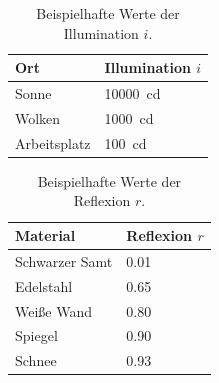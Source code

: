 \documentclass[a4paper, 11pt, accentcolor = tud3b]{tudreport}
\begin{document}
					\begin{table}
						\centering
						\begin{tabular}{l|l}
							Ort          & Illumination \(i\)   \\ \hline
							Sonne        & \SI{10000}{\candela} \\
							Wolken       & \SI{1000}{\candela}  \\
							Arbeitsplatz & \SI{100}{\candela}
						\end{tabular}
						\caption{Beispielhafte Werte der Illumination \(i\).}
						\label{tab:example_illumination}
					\end{table}
					\begin{table}
						\centering
						\begin{tabular}{l|l}
							Material       & Reflexion \(r\) \\ \hline
							Schwarzer Samt & \num{0.01}      \\
							Edelstahl      & \num{0.65}      \\
							Weiße Wand     & \num{0.80}      \\
							Spiegel        & \num{0.90}      \\
							Schnee         & \num{0.93}
						\end{tabular}
						\caption{Beispielhafte Werte der Reflexion \(r\).}
						\label{tab:example_reflexion}
					\end{table}
				
\end{document}
